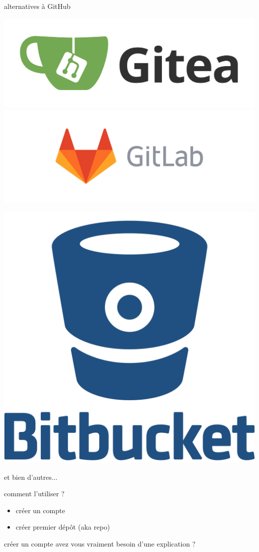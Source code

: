 \documentclass[usenames,dvipsnames]{beamer}
\begin{document}
\begin{frame}[fragile]{alternatives à GitHub}
	\begin{center}
		\includegraphics[width=0.45\linewidth]{Im/gitea-logo.png}
		\includegraphics[width=0.45\linewidth]{Im/gitlab-logo.png}
	\end{center}
	\begin{center}		
		\includegraphics[width=0.3\linewidth]{Im/bitbucket-logo.png}
	\end{center}

	et bien d'autres...

\end{frame}

\begin{frame}[fragile]{comment l'utiliser ?}
	\begin{itemize}
		\item créer un compte
		\item créer premier dépôt (aka repo)
	\end{itemize}
\end{frame}

\begin{frame}[fragile]{créer un compte}
	avez vous vraiment besoin d'une explication ?

\end{frame}
\end{document}

